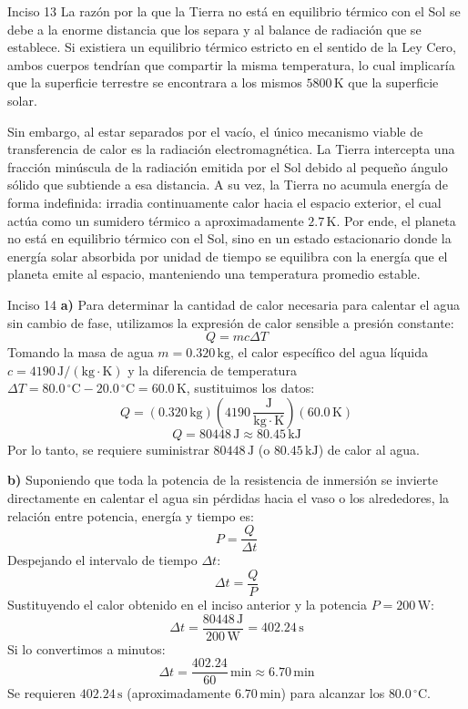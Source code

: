 \documentclass[11pt,letterpaper]{article}
\begin{document}
\begin{inciso}{Inciso 13}
La razón por la que la Tierra no está en equilibrio térmico con el Sol se debe a la enorme distancia que los separa y al balance de radiación que se establece. Si existiera un equilibrio térmico estricto en el sentido de la Ley Cero, ambos cuerpos tendrían que compartir la misma temperatura, lo cual implicaría que la superficie terrestre se encontrara a los mismos $5800\,\mathrm{K}$ que la superficie solar.

Sin embargo, al estar separados por el vacío, el único mecanismo viable de transferencia de calor es la radiación electromagnética. La Tierra intercepta una fracción minúscula de la radiación emitida por el Sol debido al pequeño ángulo sólido que subtiende a esa distancia. A su vez, la Tierra no acumula energía de forma indefinida: irradia continuamente calor hacia el espacio exterior, el cual actúa como un sumidero térmico a aproximadamente $2.7\,\mathrm{K}$. Por ende, el planeta no está en equilibrio térmico con el Sol, sino en un estado estacionario donde la energía solar absorbida por unidad de tiempo se equilibra con la energía que el planeta emite al espacio, manteniendo una temperatura promedio estable.
\end{inciso}
\begin{inciso}{Inciso 14}
\textbf{a)} Para determinar la cantidad de calor necesaria para calentar el agua sin cambio de fase, utilizamos la expresión de calor sensible a presión constante:
\[
Q = m c \Delta T
\]
Tomando la masa de agua $m = 0.320\,\mathrm{kg}$, el calor específico del agua líquida $c = 4190\,\mathrm{J}/(\mathrm{kg}\cdot\mathrm{K})$ y la diferencia de temperatura $\Delta T = 80.0\,^{\circ}\mathrm{C} - 20.0\,^{\circ}\mathrm{C} = 60.0\,\mathrm{K}$, sustituimos los datos:
\[
Q = (0.320\,\mathrm{kg})\left(4190\,\frac{\mathrm{J}}{\mathrm{kg}\cdot\mathrm{K}}\right)(60.0\,\mathrm{K})
\]
\[
Q = 80448\,\mathrm{J} \approx 80.45\,\mathrm{kJ}
\]
Por lo tanto, se requiere suministrar $80448\,\mathrm{J}$ (o $80.45\,\mathrm{kJ}$) de calor al agua.

\textbf{b)} Suponiendo que toda la potencia de la resistencia de inmersión se invierte directamente en calentar el agua sin pérdidas hacia el vaso o los alrededores, la relación entre potencia, energía y tiempo es:
\[
P = \frac{Q}{\Delta t}
\]
Despejando el intervalo de tiempo $\Delta t$:
\[
\Delta t = \frac{Q}{P}
\]
Sustituyendo el calor obtenido en el inciso anterior y la potencia $P = 200\,\mathrm{W}$:
\[
\Delta t = \frac{80448\,\mathrm{J}}{200\,\mathrm{W}} = 402.24\,\mathrm{s}
\]
Si lo convertimos a minutos:
\[
\Delta t = \frac{402.24}{60}\,\mathrm{min} \approx 6.70\,\mathrm{min}
\]
Se requieren $402.24\,\mathrm{s}$ (aproximadamente $6.70\,\mathrm{min}$) para alcanzar los $80.0\,^{\circ}\mathrm{C}$.
\end{inciso}
\end{document}
